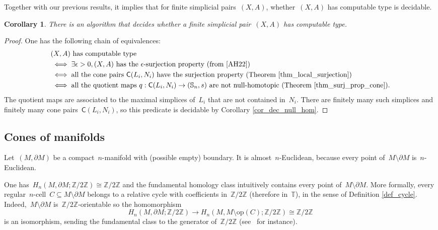 \documentclass[english,11pt]{article}
\theoremstyle{plain}
\newtheorem{corollary}{Corollary}[section]
\theoremstyle{remark}
\theoremstyle{definition}
\newcommand{\op}[1]{\mathrm{op}(#1)}
\newcommand{\Sp}{\mathbb{S}}
\newcommand{\R}{\mathbb{R}}
\newcommand{\Z}{\mathbb{Z}}
\newcommand{\RZ}{\mathbb{T}}%
\newcommand{\C}[1]{\mathsf{C}(#1)}%
\begin{document}
Together with our previous results, it implies that for finite simplicial pairs~$(X,A)$, whether~$(X,A)$ has computable type is decidable.
\begin{corollary}\label{cor_dec_comp_type}
There is an algorithm that decides whether a finite simplicial pair~$(X,A)$ has computable type.
\end{corollary}
\begin{proof}
One has the following chain of equivalences:
\begin{align*}
&(X,A)\text{ has computable type}\\
&\iff \exists \epsilon>0, (X,A)\text{ has the~$\epsilon$-surjection property (from \cite{AH22})}\\
&\iff \text{all the cone pairs~$\C{L_i,N_i}$ have the surjection property (Theorem \ref{thm_local_surjection})}\\
&\iff\text{all the quotient maps~$q:\C{L_i,N_i}\to(\Sp_n,s)$ are not null-homotopic (Theorem \ref{thm_surj_prop_cone})}.
\end{align*}
The quotient maps are associated to the maximal simplices of~$L_i$ that are not contained in~$N_i$. There are finitely many such simplices and finitely many cone pairs~$\C{L_i,N_i}$, so this predicate is decidable by Corollary \ref{cor_dec_null_hom}.
\end{proof}

\subsection{Cones of manifolds}

Let~$(M,\partial M)$ be a compact~$n$-manifold with (possible empty) boundary. It is almost~$n$-Euclidean, because every point of~$M\setminus \partial M$ is~$n$-Euclidean.

One has~$H_n(M,\partial M;\Z/2\Z)\cong \Z/2\Z$ and the fundamental homology class intuitively contains every point of~$M\setminus \partial M$. More formally, every regular~$n$-cell~$C\subseteq M\setminus \partial M$ belongs to a relative cycle with coefficients in~$\Z/2\Z$ (therefore in~$\RZ$), in the sense of Definition \ref{def_cycle}. Indeed,~$M\setminus \partial M$ is~$\Z/2\Z$-orientable so the homomorphism
\begin{equation*}
H_n(M,\partial M;\Z/2\Z)\to H_n(M,M\setminus \op{C};\Z/2\Z)\cong \Z/2\Z
\end{equation*}
is an isomorphism, sending the fundamental class to the generator of~$\Z/2\Z$ (see~\cite{Hatcher02} for instance).
\end{document}
